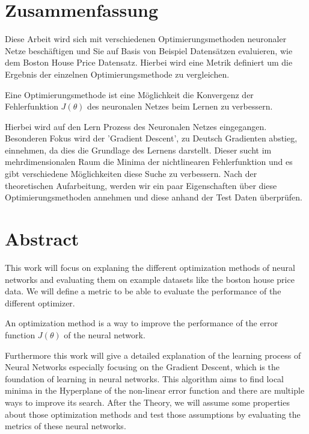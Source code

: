 \section*{Zusammenfassung}

Diese Arbeit wird sich mit verschiedenen 
Optimierungsmethoden neuronaler Netze beschäftigen
und Sie auf Basis von Beispiel Datensätzen evaluieren,
wie dem Boston House Price Datensatz.
Hierbei wird eine Metrik definiert um die Ergebnis der einzelnen 
Optimierungsmethode zu vergleichen. 

Eine Optimierungsmethode ist eine Möglichkeit
die Konvergenz der Fehlerfunktion $J(\theta)$ des neuronalen Netzes
beim Lernen zu verbessern. 
 
Hierbei wird auf den Lern Prozess des Neuronalen
Netzes eingegangen. Besonderen Fokus wird der 'Gradient Descent',
zu Deutsch Gradienten abstieg, einnehmen, da dies die Grundlage
des Lernens darstellt. Dieser sucht im mehrdimensionalen Raum
die Minima der nichtlinearen Fehlerfunktion und
es gibt verschiedene Möglichkeiten diese Suche zu verbessern.   
Nach der theoretischen Aufarbeitung,
werden wir ein paar Eigenschaften über
diese Optimierungsmethoden annehmen
und diese anhand der Test Daten überprüfen.


\section*{Abstract}

This work will focus on explaning the different optimization methods of neural networks and evaluating them
on example datasets like the boston house price data.
We will define a metric to be able to evaluate the performance 
of the different optimizer.

An optimization method is a way to improve the performance of the error 
function $J(\theta)$ of the neural network. 


Furthermore this work will give a detailed explanation of the learning process of Neural Networks
especially focusing on the Gradient Descent, which is the foundation of learning in neural networks. This algorithm aims to find local minima in the Hyperplane of the non-linear error function and there are multiple ways to improve its search. 
After the Theory, we will assume some properties about those optimization methods and test those assumptions
by evaluating the metrics of these neural networks.

